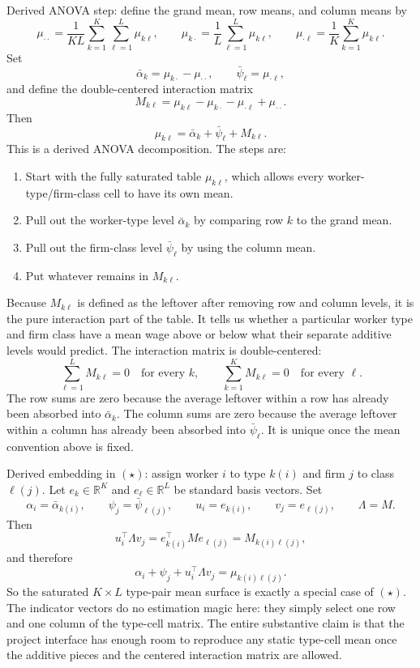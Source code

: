 ﻿\documentclass[11pt]{article}
\newcommand{\1}{\mathbf{1}}
\begin{document}
Derived ANOVA step: define the grand mean, row means, and column means by
\[
\mu_{\cdot\cdot}
=
\frac{1}{KL}\sum_{k=1}^K\sum_{\ell=1}^L\mu_{k\ell},
\qquad
\mu_{k\cdot}
=
\frac{1}{L}\sum_{\ell=1}^L\mu_{k\ell},
\qquad
\mu_{\cdot\ell}
=
\frac{1}{K}\sum_{k=1}^K\mu_{k\ell}.
\]
Set
\[
\bar\alpha_k=\mu_{k\cdot}-\mu_{\cdot\cdot},
\qquad
\bar\psi_\ell=\mu_{\cdot\ell},
\]
and define the double-centered interaction matrix
\[
M_{k\ell}
=
\mu_{k\ell}-\mu_{k\cdot}-\mu_{\cdot\ell}+\mu_{\cdot\cdot}.
\]
Then
\[
\mu_{k\ell}
=
\bar\alpha_k+\bar\psi_\ell+M_{k\ell}.
\]
This is a derived ANOVA decomposition. The steps are:
\begin{enumerate}
\item Start with the fully saturated table $\mu_{k\ell}$, which allows every
worker-type/firm-class cell to have its own mean.
\item Pull out the worker-type level $\bar\alpha_k$ by comparing row $k$ to the
grand mean.
\item Pull out the firm-class level $\bar\psi_\ell$ by using the column mean.
\item Put whatever remains in $M_{k\ell}$.
\end{enumerate}
Because $M_{k\ell}$ is defined as the leftover after removing row and column
levels, it is the pure interaction part of the table. It tells us whether a
particular worker type and firm class have a mean wage above or below what their
separate additive levels would predict. The interaction matrix is double-centered:
\[
\sum_{\ell=1}^L M_{k\ell}=0\quad\text{for every }k,
\qquad
\sum_{k=1}^K M_{k\ell}=0\quad\text{for every }\ell.
\]
The row sums are zero because the average leftover within a row has already been
absorbed into $\bar\alpha_k$. The column sums are zero because the average
leftover within a column has already been absorbed into $\bar\psi_\ell$. It is
unique once the mean convention above is fixed.

Derived embedding in $(\star)$: assign worker $i$ to type $k(i)$ and firm $j$ to class $\ell(j)$. Let
$e_k\in\mathbb R^K$ and $e_\ell\in\mathbb R^L$ be standard basis vectors. Set
\[
\alpha_i=\bar\alpha_{k(i)},
\qquad
\psi_j=\bar\psi_{\ell(j)},
\qquad
u_i=e_{k(i)},
\qquad
v_j=e_{\ell(j)},
\qquad
\Lambda=M.
\]
Then
\[
u_i^\top\Lambda v_j
=
e_{k(i)}^\top M e_{\ell(j)}
=
M_{k(i)\ell(j)},
\]
and therefore
\[
\alpha_i+\psi_j+u_i^\top\Lambda v_j
=
\mu_{k(i)\ell(j)}.
\]
So the saturated $K\times L$ type-pair mean surface is exactly a special case of
$(\star)$. The indicator vectors do no estimation magic here: they simply select
one row and one column of the type-cell matrix. The entire substantive claim is
that the project interface has enough room to reproduce any static type-cell
mean once the additive pieces and the centered interaction matrix are allowed.
\end{document}
